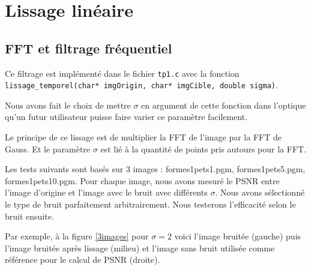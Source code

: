 \documentclass[paper=a4, fontsize=11pt]{scrartcl} %
\begin{document}
\section{Lissage linéaire}
\subsection{FFT et filtrage fréquentiel}
Ce filtrage est implémenté dans le fichier \texttt{tp1.c} avec la fonction \texttt{lissage\_temporel(char* imgOrigin, char* imgCible, double sigma)}. 

Nous avons fait le choix de mettre $\sigma$ en argument de cette fonction dans l'optique qu'un futur utilisateur puisse faire varier ce paramètre facilement. 

Le principe de ce lissage est de multiplier la FFT de l'image par la FFT de Gauss. Et le paramètre $\sigma$ est lié à la quantité de points pris autours pour la FFT. 

Les tests suivants sont basés sur 3 images : formes1pets1.pgm, formes1pets5.pgm, formes1pets10.pgm. Pour chaque image, nous avons mesuré le PSNR entre l'image d'origine et l'image avec le bruit avec différents $\sigma$. Nous avons sélectionné le type de bruit parfaitement arbitrairement. Nous testerons l'efficacité selon le bruit ensuite. 


Par exemple, à la figure \ref{3images} pour $\sigma=2$ voici l'image bruitée (gauche) puis l'image bruitée après lissage (milieu) et l'image sans bruit utilisée comme référence pour le calcul de PSNR (droite).
\end{document}
